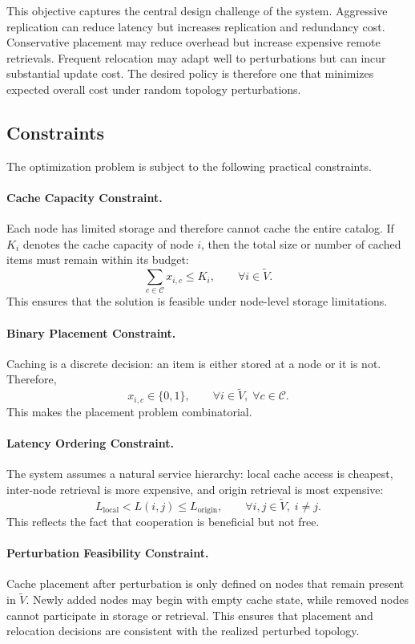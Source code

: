 This objective captures the central design challenge of the system. Aggressive replication can reduce latency but increases replication and redundancy cost. Conservative placement may reduce overhead but increase expensive remote retrievals. Frequent relocation may adapt well to perturbations but can incur substantial update cost. The desired policy is therefore one that minimizes expected overall cost under random topology perturbations.

\subsection{Constraints}

The optimization problem is subject to the following practical constraints.

\paragraph{Cache Capacity Constraint.}
Each node has limited storage and therefore cannot cache the entire catalog. If \(K_i\) denotes the cache capacity of node \(i\), then the total size or number of cached items must remain within its budget:
\[
\sum_{c \in \mathcal{C}} x_{i,c} \le K_i,
\qquad \forall i \in \tilde{V}.
\]
This ensures that the solution is feasible under node-level storage limitations.

\paragraph{Binary Placement Constraint.}
Caching is a discrete decision: an item is either stored at a node or it is not. Therefore,
\[
x_{i,c} \in \{0,1\},
\qquad \forall i \in \tilde{V},\; \forall c \in \mathcal{C}.
\]
This makes the placement problem combinatorial.

\paragraph{Latency Ordering Constraint.}
The system assumes a natural service hierarchy: local cache access is cheapest, inter-node retrieval is more expensive, and origin retrieval is most expensive:
\[
L_{\text{local}} < L(i,j) \le L_{\text{origin}},
\qquad \forall i,j \in \tilde{V},\; i \neq j.
\]
This reflects the fact that cooperation is beneficial but not free.

\paragraph{Perturbation Feasibility Constraint.}
Cache placement after perturbation is only defined on nodes that remain present in \(\tilde{V}\). Newly added nodes may begin with empty cache state, while removed nodes cannot participate in storage or retrieval. This ensures that placement and relocation decisions are consistent with the realized perturbed topology.

